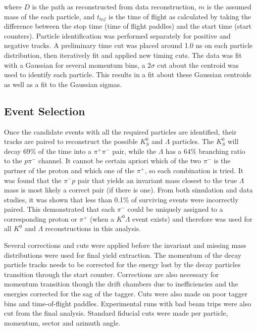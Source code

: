 \documentclass[prb,10pt,twocolumn,tightenlines,superscriptaddress]{revtex4-1}
\begin{document}
\noindent where $D$ is the path as reconstructed from data reconstruction, $m$ is the assumed mass of the each particle, and $t_{tof}$ is the time of flight as calculated by taking the difference between the stop time (time of flight paddles) and the start time (start counters).
Particle identification was performed separately for positive and negative tracks.
A preliminary time cut was placed around 1.0 ns on each particle distribution, then iteratively fit and applied new timing cuts.
The data was fit with a Gaussian for several momentum bins, a $2\sigma$ cut about the centroid was used to identify each particle. This results in a fit about these Gaussian centroids as well as a fit to the Gaussian sigmas. 

\subsection{Event Selection}
Once the candidate events with all the required particles are identified, their tracks are paired to reconstruct the possible $K^{0}_{S}$ and $\Lambda$ particles.
The $K^{0}_{S}$ will decay 69\% of the time into a $\pi^{+}\pi^{-}$ pair\cite{bib:pdgKshort}, while the $\Lambda$ has a 64\% branching ratio to the $p\pi^{-}$ channel\cite{bib:pdgLambda}. It cannot be certain apriori which of the two $\pi^{-}$ is the partner of the proton and which one of the $\pi^{+}$, so each combination is tried. It was found that the $\pi^{-}p$ pair that yields an invariant mass closest to the true $\Lambda$ mass is most likely a correct pair (if there is one). From both simulation and data studies, it was shown that less than 0.1\% of surviving events were incorrectly paired. This demonstrated that each  $\pi^{-}$  could be uniquely assigned to a corresponding proton or $\pi^{+}$ (when a $K^{0}\Lambda$  event exists) and therefore was used for all $K^{0}$ and $\Lambda$  reconstructions in this analysis.

Several corrections and cuts were applied before the invariant and missing mass distributions were used for final yield extraction. The momentum of the decay particle tracks needs to be corrected for the energy lost by the decay particles transition through the start counter\cite{bib:ref9}. Corrections are also necessary for momentum transition though the drift chambers due to inefficiencies and the energies corrected for the sag of the tagger\cite{bib:g13studies}.  Cuts were also made on poor tagger bins and time-of-flight paddles. Experimental runs with bad beam trips were also cut from the final analysis\cite{bib:g13studies}. Standard fiducial cuts were made per particle, momentum, sector and azimuth angle. 
\end{document}
